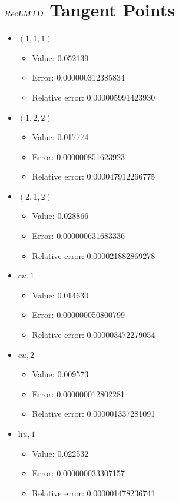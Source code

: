 \documentclass{article}%
\begin{document}
\section{$\textsl{RecLMTD}$ Tangent Points}%
\thispagestyle{plain}%
\begin{itemize}%
	\item $(1, 1, 1)$%
	\begin{itemize}%
		\item Value: 0.052139%
		\item Error: 0.000000312385834%
		\item Relative error: 0.000005991423930%
	\end{itemize}%
	\item $(1, 2, 2)$%
	\begin{itemize}%
		\item Value: 0.017774%
		\item Error: 0.000000851623923%
		\item Relative error: 0.000047912266775%
	\end{itemize}%
	\item $(2, 1, 2)$%
	\begin{itemize}%
		\item Value: 0.028866%
		\item Error: 0.000000631683336%
		\item Relative error: 0.000021882869278%
	\end{itemize}%
	\item $\textit{cu},1$%
	\begin{itemize}%
		\item Value: 0.014630%
		\item Error: 0.000000050800799%
		\item Relative error: 0.000003472279054%
	\end{itemize}%
	\item $\textit{cu},2$%
	\begin{itemize}%
		\item Value: 0.009573%
		\item Error: 0.000000012802281%
		\item Relative error: 0.000001337281091%
	\end{itemize}%
	\item $\textit{hu},1$%
	\begin{itemize}%
		\item Value: 0.022532%
		\item Error: 0.000000033307157%
		\item Relative error: 0.000001478236741%
	\end{itemize}%
\end{itemize}%
\end{document}
